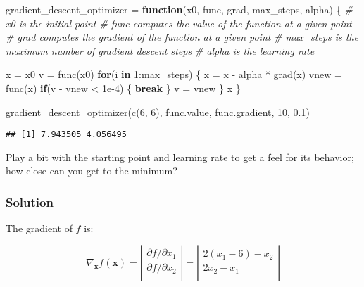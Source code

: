 \documentclass[
  a4paper,
]{article}
\newenvironment{Shaded}{\begin{snugshade}}{\end{snugshade}}
\newcommand{\CommentTok}[1]{\textcolor[rgb]{0.56,0.35,0.01}{\textit{#1}}}
\newcommand{\ControlFlowTok}[1]{\textcolor[rgb]{0.13,0.29,0.53}{\textbf{#1}}}
\newcommand{\DecValTok}[1]{\textcolor[rgb]{0.00,0.00,0.81}{#1}}
\newcommand{\FloatTok}[1]{\textcolor[rgb]{0.00,0.00,0.81}{#1}}
\newcommand{\FunctionTok}[1]{\textcolor[rgb]{0.00,0.00,0.00}{#1}}
\newcommand{\NormalTok}[1]{#1}
\newcommand{\OtherTok}[1]{\textcolor[rgb]{0.56,0.35,0.01}{#1}}
\newcommand{\SpecialCharTok}[1]{\textcolor[rgb]{0.00,0.00,0.00}{#1}}
\begin{document}
\begin{Shaded}
\begin{Highlighting}[]
\NormalTok{gradient\_descent\_optimizer }\OtherTok{=} \ControlFlowTok{function}\NormalTok{(x0, func, grad, max\_steps, alpha) \{}
  \CommentTok{\# x0 is the initial point}
  \CommentTok{\# func computes the value of the function at a given point}
  \CommentTok{\# grad computes the gradient of the function at a given point}
  \CommentTok{\# max\_steps is the maximum number of gradient descent steps}
  \CommentTok{\# alpha is the learning rate}
  
\NormalTok{  x }\OtherTok{=}\NormalTok{ x0}
\NormalTok{  v }\OtherTok{=} \FunctionTok{func}\NormalTok{(x0)}
  \ControlFlowTok{for}\NormalTok{(i }\ControlFlowTok{in} \DecValTok{1}\SpecialCharTok{:}\NormalTok{max\_steps) \{}
\NormalTok{    x }\OtherTok{=}\NormalTok{ x }\SpecialCharTok{{-}}\NormalTok{ alpha }\SpecialCharTok{*} \FunctionTok{grad}\NormalTok{(x)}
\NormalTok{    vnew }\OtherTok{=} \FunctionTok{func}\NormalTok{(x)}
    \ControlFlowTok{if}\NormalTok{(v }\SpecialCharTok{{-}}\NormalTok{ vnew }\SpecialCharTok{\textless{}} \FloatTok{1e{-}4}\NormalTok{) \{}
      \ControlFlowTok{break}
\NormalTok{    \}}
\NormalTok{    v }\OtherTok{=}\NormalTok{ vnew}
\NormalTok{  \}}
\NormalTok{  x}
\NormalTok{\}}

\FunctionTok{gradient\_descent\_optimizer}\NormalTok{(}\FunctionTok{c}\NormalTok{(}\DecValTok{6}\NormalTok{, }\DecValTok{6}\NormalTok{), func.value, func.gradient, }\DecValTok{10}\NormalTok{, }\FloatTok{0.1}\NormalTok{)}
\end{Highlighting}
\end{Shaded}

\begin{verbatim}
## [1] 7.943505 4.056495
\end{verbatim}

Play a bit with the starting point and learning rate to get a feel for
its behavior; how close can you get to the minimum?

\hypertarget{solution}{%
\subsubsection{Solution}\label{solution}}

The gradient of \(f\) is:

\[
\nabla_{\textbf{x}}f(\textbf{x})=\left\vert\begin{matrix}
\partial f/\partial x_1 \\
\partial f/\partial x_2 \\
\end{matrix}\right\vert=\left\vert\begin{matrix}
2(x_1-6)-x_2 \\
2x_2-x_1 \\
\end{matrix}\right\vert
\]
\end{document}
